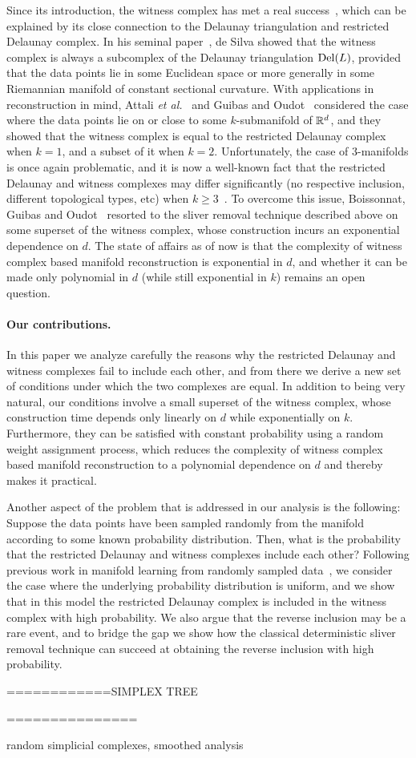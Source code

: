 Since its introduction, the witness complex has met a real
success~\cite{ae-wcrd-07,bgo-mrwc-09,cidsz-lbsni-08,co-tpbr-08,cds-teuwc-04,go-ruwc-08},
which can be explained by its close connection to the Delaunay
triangulation and restricted Delaunay complex. In his seminal
paper~\cite{vds-wdt-08}, de Silva showed that the witness complex is
always a subcomplex of the Delaunay triangulation ${\rm Del}(L)$, provided
that the data points lie in some Euclidean space or more generally in
some Riemannian manifold of constant sectional curvature. With
applications in reconstruction in mind, Attali {\em et
  al.}~\cite{ae-wcrd-07} and Guibas and Oudot~\cite{go-ruwc-08}
considered the case where the data points lie on or close to some
$k$-submanifold of $\mathbb R^d$, and they showed that the witness complex is
equal to the restricted Delaunay complex when $k=1$, and a subset of
it when $k=2$. Unfortunately, the case of $3$-manifolds is once again
problematic, and it is now a well-known fact that the restricted
Delaunay and witness complexes may differ
significantly (no respective inclusion,  different
  topological types, etc) when $k\geq 3$~\cite{o-ntrdwchd-07}. To overcome
this issue, Boissonnat, Guibas and Oudot~\cite{bgo-mrwc-09} resorted
to the sliver removal technique described above on some superset of
the witness complex, whose construction incurs an exponential
dependence on $d$. The state of affairs as of now is that the
complexity of witness complex based manifold reconstruction is
exponential in $d$, and whether it can be made only polynomial in $d$
(while still exponential in $k$) remains an open question.


\paragraph*{Our contributions.}
In this paper we analyze carefully the reasons why the restricted
Delaunay and witness complexes fail to include each other, and from there
we derive a new set of conditions under which the two complexes are
equal. In addition to being very natural, our conditions involve a
small superset of the witness complex, whose construction time depends
only linearly on $d$ while exponentially on $k$. Furthermore, they can
be satisfied with constant probability using a random weight
assignment process, which reduces the complexity of witness complex
based manifold reconstruction to a polynomial dependence on $d$ and
thereby makes it practical.

Another aspect of the problem that is addressed in our analysis is the
following: Suppose the data points have been sampled randomly from the
manifold according to some known probability distribution. Then, what
is the probability that the restricted Delaunay and witness complexes
include each other? Following previous work in manifold learning from
randomly sampled data~\cite{nsw-fhswhc-04}, we consider the case where
the underlying probability distribution is uniform, and we show that
in this model the restricted Delaunay complex is included in the
witness complex with high probability. We also argue that the reverse
inclusion may be a rare event, and to bridge the gap we show how the
classical deterministic sliver removal technique can succeed at
obtaining the reverse inclusion with high probability.


============SIMPLEX TREE


===============

random simplicial complexes, smoothed analysis



